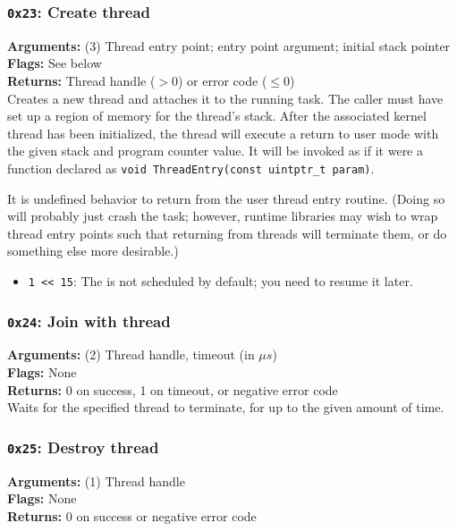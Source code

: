 \documentclass[11pt]{article}
\begin{document}
\subsubsection{{\tt 0x23}: Create thread}
\textbf{Arguments:} (3) Thread entry point; entry point argument; initial stack pointer \\
\textbf{Flags:} See below \\
\textbf{Returns:} Thread handle ($>0$) or error code ($\leq0$) \\

Creates a new thread and attaches it to the running task. The caller must have set up a region of memory for the thread's stack. After the associated kernel thread has been initialized, the thread will execute a return to user mode with the given stack and program counter value. It will be invoked as if it were a function declared as \texttt{void ThreadEntry(const uintptr\_t param)}.

It is undefined behavior to return from the user thread entry routine. (Doing so will probably just crash the task; however, runtime libraries may wish to wrap thread entry points such that returning from threads will terminate them, or do something else more desirable.)

\begin{itemize}
\item \texttt{1 << 15}: The is not scheduled by default; you need to resume it later.
\end{itemize}

\subsubsection{{\tt 0x24}: Join with thread}
\textbf{Arguments:} (2) Thread handle, timeout (in $\mu s$) \\
\textbf{Flags:} None \\
\textbf{Returns:} 0 on success, 1 on timeout, or negative error code \\

Waits for the specified thread to terminate, for up to the given amount of time.

\subsubsection{{\tt 0x25}: Destroy thread}
\textbf{Arguments:} (1) Thread handle \\
\textbf{Flags:} None \\
\textbf{Returns:} 0 on success or negative error code \\
\end{document}

